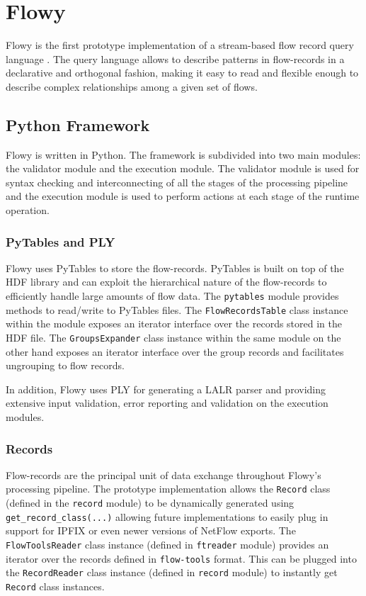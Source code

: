 \chapter{Flowy}\label{ch:flowy-design}

Flowy \cite{kkanev:2010, kkanev:thesis:2009} is the first prototype implementation of a stream-based flow record query language \cite{vmarinov:thesis:2009, vmarinov:2009, vmarinov:2008}. The query language allows to describe patterns in flow-records in a declarative and orthogonal fashion, making it easy to read and flexible enough to describe complex relationships among a given set of flows. 

\section{Python Framework}\label{sec:python-framework}
Flowy is written in Python. The framework is subdivided into two main modules: the validator module and the execution module. The validator module is used for syntax checking and interconnecting of all the stages of the processing pipeline and the execution module is used to perform actions at each stage of the runtime operation. 

\subsection{PyTables and PLY}\label{subsec:pytable-ply}
Flowy uses PyTables \cite{falted:2003} to store the flow-records. PyTables is built on top of the \ac{HDF} library and can exploit the hierarchical nature of the flow-records to efficiently handle large amounts of flow data. The \texttt{pytables} module provides methods to read/write to PyTables files. The \texttt{FlowRecordsTable} class instance within the module exposes an iterator interface over the records stored in the HDF file. The \texttt{GroupsExpander} class instance within the same module on the other hand exposes an iterator interface over the group records and facilitates ungrouping to flow records.

In addition, Flowy uses \ac{PLY} for generating a \ac{LALR} parser and providing extensive input validation, error reporting and validation on the execution modules. 

\subsection{Records}\label{subsec:records}
Flow-records are the principal unit of data exchange throughout Flowy's processing pipeline. The prototype implementation allows the \texttt{Record} class (defined in the \texttt{record} module) to be dynamically generated using \texttt{get\_record\_class(...)} allowing future implementations to easily plug in support for \ac{IPFIX} or even newer versions of NetFlow \cite{rfc3954} exports. The \texttt{FlowToolsReader} class instance (defined in \texttt{ftreader} module) provides an iterator over the records defined in \texttt{flow-tools} format. This can be plugged into the \texttt{RecordReader} class instance (defined in \texttt{record} module) to instantly get \texttt{Record} class instances.

